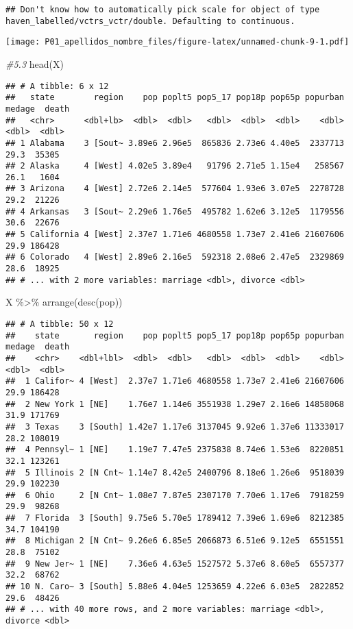 \documentclass[
]{article}
\newenvironment{Shaded}{\begin{snugshade}}{\end{snugshade}}
\newcommand{\CommentTok}[1]{\textcolor[rgb]{0.56,0.35,0.01}{\textit{#1}}}
\newcommand{\FunctionTok}[1]{\textcolor[rgb]{0.00,0.00,0.00}{#1}}
\newcommand{\NormalTok}[1]{#1}
\newcommand{\SpecialCharTok}[1]{\textcolor[rgb]{0.00,0.00,0.00}{#1}}
\begin{document}
\begin{verbatim}
## Don't know how to automatically pick scale for object of type haven_labelled/vctrs_vctr/double. Defaulting to continuous.
\end{verbatim}

\texttt{[image: P01\_apellidos\_nombre\_files/figure-latex/unnamed-chunk-9-1.pdf]}

\begin{Shaded}
\begin{Highlighting}[]
\CommentTok{\#5.3}
\FunctionTok{head}\NormalTok{(X)}
\end{Highlighting}
\end{Shaded}

\begin{verbatim}
## # A tibble: 6 x 12
##   state        region    pop poplt5 pop5_17 pop18p pop65p popurban medage  death
##   <chr>      <dbl+lb>  <dbl>  <dbl>   <dbl>  <dbl>  <dbl>    <dbl>  <dbl>  <dbl>
## 1 Alabama    3 [Sout~ 3.89e6 2.96e5  865836 2.73e6 4.40e5  2337713   29.3  35305
## 2 Alaska     4 [West] 4.02e5 3.89e4   91796 2.71e5 1.15e4   258567   26.1   1604
## 3 Arizona    4 [West] 2.72e6 2.14e5  577604 1.93e6 3.07e5  2278728   29.2  21226
## 4 Arkansas   3 [Sout~ 2.29e6 1.76e5  495782 1.62e6 3.12e5  1179556   30.6  22676
## 5 California 4 [West] 2.37e7 1.71e6 4680558 1.73e7 2.41e6 21607606   29.9 186428
## 6 Colorado   4 [West] 2.89e6 2.16e5  592318 2.08e6 2.47e5  2329869   28.6  18925
## # ... with 2 more variables: marriage <dbl>, divorce <dbl>
\end{verbatim}

\begin{Shaded}
\begin{Highlighting}[]
\NormalTok{X }\SpecialCharTok{\%\textgreater{}\%} \FunctionTok{arrange}\NormalTok{(}\FunctionTok{desc}\NormalTok{(pop))}
\end{Highlighting}
\end{Shaded}

\begin{verbatim}
## # A tibble: 50 x 12
##    state       region    pop poplt5 pop5_17 pop18p pop65p popurban medage  death
##    <chr>    <dbl+lbl>  <dbl>  <dbl>   <dbl>  <dbl>  <dbl>    <dbl>  <dbl>  <dbl>
##  1 Califor~ 4 [West]  2.37e7 1.71e6 4680558 1.73e7 2.41e6 21607606   29.9 186428
##  2 New York 1 [NE]    1.76e7 1.14e6 3551938 1.29e7 2.16e6 14858068   31.9 171769
##  3 Texas    3 [South] 1.42e7 1.17e6 3137045 9.92e6 1.37e6 11333017   28.2 108019
##  4 Pennsyl~ 1 [NE]    1.19e7 7.47e5 2375838 8.74e6 1.53e6  8220851   32.1 123261
##  5 Illinois 2 [N Cnt~ 1.14e7 8.42e5 2400796 8.18e6 1.26e6  9518039   29.9 102230
##  6 Ohio     2 [N Cnt~ 1.08e7 7.87e5 2307170 7.70e6 1.17e6  7918259   29.9  98268
##  7 Florida  3 [South] 9.75e6 5.70e5 1789412 7.39e6 1.69e6  8212385   34.7 104190
##  8 Michigan 2 [N Cnt~ 9.26e6 6.85e5 2066873 6.51e6 9.12e5  6551551   28.8  75102
##  9 New Jer~ 1 [NE]    7.36e6 4.63e5 1527572 5.37e6 8.60e5  6557377   32.2  68762
## 10 N. Caro~ 3 [South] 5.88e6 4.04e5 1253659 4.22e6 6.03e5  2822852   29.6  48426
## # ... with 40 more rows, and 2 more variables: marriage <dbl>, divorce <dbl>
\end{verbatim}
\end{document}
